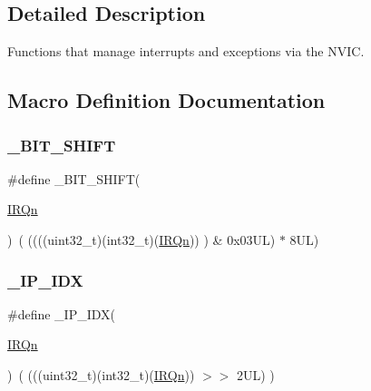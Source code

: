 \subsection{Detailed Description}
Functions that manage interrupts and exceptions via the N\+V\+IC. 



\subsection{Macro Definition Documentation}
\mbox{\label{group___c_m_s_i_s___core___n_v_i_c_functions_ga53c75b28823441c6153269f0ecbed878}} 
\subsubsection{\texorpdfstring{\+\_\+\+B\+I\+T\+\_\+\+S\+H\+I\+FT}{\_BIT\_SHIFT}}
{\footnotesize\ttfamily \#define \+\_\+\+B\+I\+T\+\_\+\+S\+H\+I\+FT(\begin{DoxyParamCaption}\item[{}]{\mbox{\hyperlink{group___interrupt__vector__numbers_ga666eb0caeb12ec0e281415592ae89083}{I\+R\+Qn}} }\end{DoxyParamCaption})~(  ((((uint32\+\_\+t)(int32\+\_\+t)(\mbox{\hyperlink{group___interrupt__vector__numbers_ga666eb0caeb12ec0e281415592ae89083}{I\+R\+Qn}}))         )      \&  0x03\+U\+L) $\ast$ 8\+U\+L)}

\mbox{\label{group___c_m_s_i_s___core___n_v_i_c_functions_ga370ec4b1751a6a889d849747df3763a9}} 
\subsubsection{\texorpdfstring{\+\_\+\+I\+P\+\_\+\+I\+DX}{\_IP\_IDX}}
{\footnotesize\ttfamily \#define \+\_\+\+I\+P\+\_\+\+I\+DX(\begin{DoxyParamCaption}\item[{}]{\mbox{\hyperlink{group___interrupt__vector__numbers_ga666eb0caeb12ec0e281415592ae89083}{I\+R\+Qn}} }\end{DoxyParamCaption})~(   (((uint32\+\_\+t)(int32\+\_\+t)(\mbox{\hyperlink{group___interrupt__vector__numbers_ga666eb0caeb12ec0e281415592ae89083}{I\+R\+Qn}}))                $>$$>$    2\+U\+L)      )}

